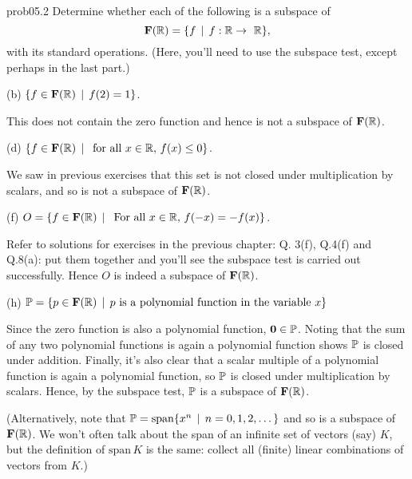 \begin{sol}{prob05.2}   Determine whether each of the following is a subspace of  $$\mathbf{F}(\mathbb{R})=\{f \,\mid \, f: \mathbb{R} \to~\mathbb{R} \},$$ with its standard operations. (Here, you'll need to use the subspace test, except perhaps in the last part.)  
 
 \medskip


(b) $\{f \in \mathbf{F}(\mathbb{R}) \,\mid \, f(2)=1  \}$. 

\soln This does not contain the zero function and hence is not a subspace of $\mathbf{F}(\mathbb{R})$. \medskip
% 

(d)   $\{f \in \mathbf{F}(\mathbb{R}) \,\mid \, \text{ for all } x\in \mathbb{R},   \, f(x)\le 0 \}$. 

\soln We saw in previous exercises that this set is not closed under multiplication by scalars, and so is not a subspace of $\mathbf{F}(\mathbb{R})$.\medskip 

(f)   $O=\{f \in \mathbf{F}(\mathbb{R}) \,\mid \, \text{ For all } x\in \mathbb{R},   \, f(-x)= -f(x) \}$.  

\soln Refer to solutions for exercises in the previous chapter: Q. 3(f), Q.4(f) and Q.8(a): put them together and you'll see the subspace test is carried out successfully. Hence  $O$ is indeed a subspace of $\mathbf{F}(\mathbb{R})$.\medskip 
%




(h) $\mathbb{P}=\{p \in \mathbf{F}(\mathbb{R})   \,\mid \, p \text{ is a polynomial function in the variable } x \}$

 \soln Since the zero function is also a polynomial function, ${\bf 0} \in \mathbb{P}$. Noting that the sum of any two polynomial functions is again a polynomial function shows $\mathbb{P}$ is closed under addition. Finally, it's also clear that a scalar multiple of a polynomial function is again a polynomial function, so $\mathbb{P}$ is closed under multiplication by scalars. Hence, by the subspace test, $\mathbb{P}$ is a subspace of $\mathbf{F}(\mathbb{R})$. 

(Alternatively, note that $\mathbb{P}=\textrm{span}\{x^n \,\mid \, n=0, 1,2, \dots\}$ and so is a subspace of $\mathbf{F}(\mathbb{R})$. We won't often talk about the span of an infinite set of vectors (say) $K$, but the  definition of $\text{span}\,K$ is the same: collect all (finite) linear combinations of vectors from $K$.)\medskip 
%
 


\end{sol}

